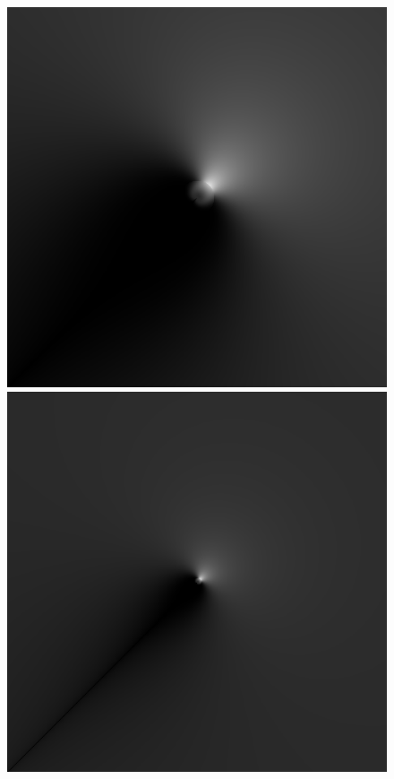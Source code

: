 \begin{figure}
{ }
 \subtop
 {
 \includegraphics[scale=0.25]{figures/dfilt_wur_sqrt2.png}
 }
 \hfill
 \subtop
 {
 \includegraphics[scale=0.25]{figures/dfilt_wur_sqrt8.png}
 }
 \hfill
 \subtop

\end{figure}
